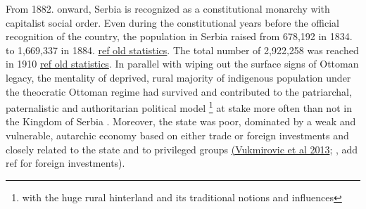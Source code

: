 \documentclass[11pt]{report}
\begin{document}
From 1882. onward, Serbia is recognized as a constitutional monarchy with capitalist social order. Even during the constitutional years before the official recognition of the country, the population in Serbia raised from 678,192 in 1834. to 1,669,337 in 1884. \href{ref}{ref old statistics}. The total number of 2,922,258 was reached in 1910 \href{ref}{ref old statistics}. 
In parallel with wiping out the surface signs of Ottoman legacy, the mentality of deprived, rural majority of indigenous population under the theocratic Ottoman regime had survived and contributed to the patriarchal, paternalistic and authoritarian political model
\footnote{with the huge rural hinterland and its traditional notions and influences}
at stake more often than not in the Kingdom of Serbia \href{ref}{\citealt{vukmirovic_city_2013}}. Moreover, the state was poor, dominated by a weak and vulnerable, autarchic economy based on either trade or foreign investments and closely related to the state and to privileged groups \href{ref}{(Vukmirovic et al 2013}; \href{Samardzic}{\citealt{doytchinov_belgrade_2015}}, add ref for foreign investments).
\\
\end{document}
